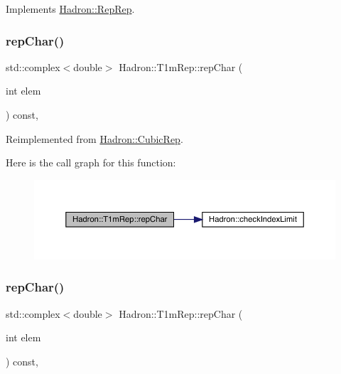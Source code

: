 Implements \mbox{\hyperlink{structHadron_1_1RepRep_ab3213025f6de249f7095892109575fde}{Hadron\+::\+Rep\+Rep}}.

\mbox{\label{structHadron_1_1T1mRep_a3605cd47c3e2c6eb4d6982fafa0a1b89}} 
\subsubsection{\texorpdfstring{repChar()}{repChar()}\hspace{0.1cm}{\footnotesize\ttfamily [1/2]}}
{\footnotesize\ttfamily std\+::complex$<$double$>$ Hadron\+::\+T1m\+Rep\+::rep\+Char (\begin{DoxyParamCaption}\item[{int}]{elem }\end{DoxyParamCaption}) const\hspace{0.3cm}{\ttfamily [inline]}, {\ttfamily [virtual]}}



Reimplemented from \mbox{\hyperlink{structHadron_1_1CubicRep_af45227106e8e715e84b0af69cd3b36f8}{Hadron\+::\+Cubic\+Rep}}.

Here is the call graph for this function\+:
\nopagebreak
\begin{figure}[H]
\begin{center}
\leavevmode
\includegraphics[width=350pt]{de/dd9/structHadron_1_1T1mRep_a3605cd47c3e2c6eb4d6982fafa0a1b89_cgraph}
\end{center}
\end{figure}
\mbox{\label{structHadron_1_1T1mRep_a3605cd47c3e2c6eb4d6982fafa0a1b89}} 
\subsubsection{\texorpdfstring{repChar()}{repChar()}\hspace{0.1cm}{\footnotesize\ttfamily [2/2]}}
{\footnotesize\ttfamily std\+::complex$<$double$>$ Hadron\+::\+T1m\+Rep\+::rep\+Char (\begin{DoxyParamCaption}\item[{int}]{elem }\end{DoxyParamCaption}) const\hspace{0.3cm}{\ttfamily [inline]}, {\ttfamily [virtual]}}



